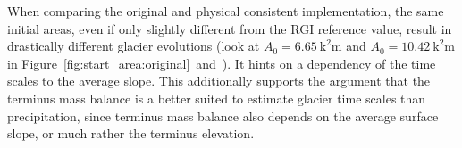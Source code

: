         When comparing the original and physical consistent implementation, the same initial areas, even if only slightly different from the RGI reference value, result in drastically different glacier evolutions (look at $A_0 = \SI{6.65}{\square\kilo\meter}$ and $A_0 = \SI{10.42}{\square\kilo\meter}$ in Figure~\ref{fig:start_area:original}~and~). It hints on a dependency of the time scales to the average slope. This additionally supports the argument that the terminus mass balance is a better suited to estimate glacier time scales than precipitation, since terminus mass balance also depends on the average surface slope, or much rather the terminus elevation.

    
       


